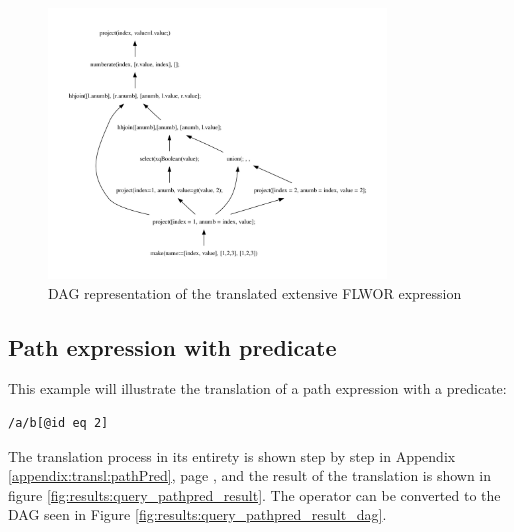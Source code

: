 \begin{figure}[!htp]
\begin{center}
  \includegraphics[width=0.8\textwidth]{img/graphs/ext_flwor_dag}
  \caption{DAG representation of the translated extensive FLWOR expression}
  \label{fig:results:query_ext_flwor_dag}
\end{center}
\end{figure}

\newpage
\subsection{Path expression with predicate}
This example will illustrate the translation of a path expression with a predicate:

\begin{Verbatim}
/a/b[@id eq 2] 
\end{Verbatim}

The translation process in its entirety is shown step by step in Appendix \ref{appendix:transl:pathPred}, page
\pageref{appendix:transl:pathPred}, and the result of the translation is shown in figure
\ref{fig:results:query_pathpred_result}. The operator can be converted to the DAG seen in Figure
\ref{fig:results:query_pathpred_result_dag}.

